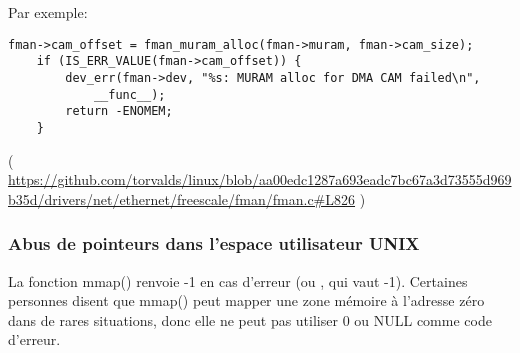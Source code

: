 Par exemple:

\begin{lstlisting}[style=customc]
	fman->cam_offset = fman_muram_alloc(fman->muram, fman->cam_size);
	if (IS_ERR_VALUE(fman->cam_offset)) {
		dev_err(fman->dev, "%s: MURAM alloc for DMA CAM failed\n",
			__func__);
		return -ENOMEM;
	}
\end{lstlisting}

( \url{https://github.com/torvalds/linux/blob/aa00edc1287a693eadc7bc67a3d73555d969b35d/drivers/net/ethernet/freescale/fman/fman.c#L826} )

\subsubsection{Abus de pointeurs dans l'espace utilisateur UNIX}

La fonction mmap() renvoie -1 en cas d'erreur (ou , qui vaut -1).
Certaines personnes disent que mmap() peut mapper une zone mémoire à l'adresse zéro
dans de rares situations, donc elle ne peut pas utiliser 0 ou NULL comme code d'erreur.

